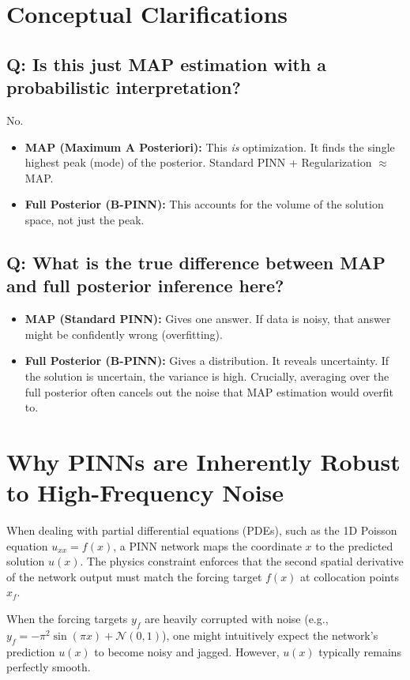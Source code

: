 \documentclass[11pt, a4paper]{article}
\begin{document}
\section{Conceptual Clarifications}

\subsection*{Q: Is this just MAP estimation with a probabilistic interpretation?}
No.
\begin{itemize}
    \item \textbf{MAP (Maximum A Posteriori):} This \textit{is} optimization. It finds the single highest peak (mode) of the posterior. Standard PINN + Regularization $\approx$ MAP.
    \item \textbf{Full Posterior (B-PINN):} This accounts for the volume of the solution space, not just the peak.
\end{itemize}

\subsection*{Q: What is the true difference between MAP and full posterior inference here?}
\begin{itemize}
    \item \textbf{MAP (Standard PINN):} Gives one answer. If data is noisy, that answer might be confidently wrong (overfitting).
    \item \textbf{Full Posterior (B-PINN):} Gives a distribution. It reveals uncertainty. If the solution is uncertain, the variance is high. Crucially, averaging over the full posterior often cancels out the noise that MAP estimation would overfit to.
\end{itemize}

\section{Why PINNs are Inherently Robust to High-Frequency Noise}

When dealing with partial differential equations (PDEs), such as the 1D Poisson equation $u_{xx} = f(x)$, a PINN network maps the coordinate $x$ to the predicted solution $u(x)$. The physics constraint enforces that the second spatial derivative of the network output must match the forcing target $f(x)$ at collocation points $x_f$.

When the forcing targets $y_f$ are heavily corrupted with noise (e.g., $y_f = -\pi^2 \sin(\pi x) + \mathcal{N}(0, 1)$), one might intuitively expect the network's prediction $u(x)$ to become noisy and jagged. However, $u(x)$ typically remains perfectly smooth. 
\end{document}
